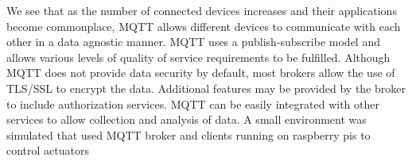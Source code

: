 \documentclass[sigconf]{acmart}
\begin{document}
We see that as the number of connected devices increases and their
applications become commonplace, MQTT allows different devices to
communicate with each other in a data agnostic manner. MQTT uses a
publish-subscribe model and allows various levels of quality of
service requirements to be fulfilled. Although MQTT does not provide
data security by default, most brokers allow the use of TLS/SSL to
encrypt the data. Additional features may be provided by the broker to
include authorization services. MQTT can be easily integrated with
other services to allow collection and analysis of data. A small
environment was simulated that used MQTT broker and clients running on
raspberry pis to control actuators


 

%
\end{document}
